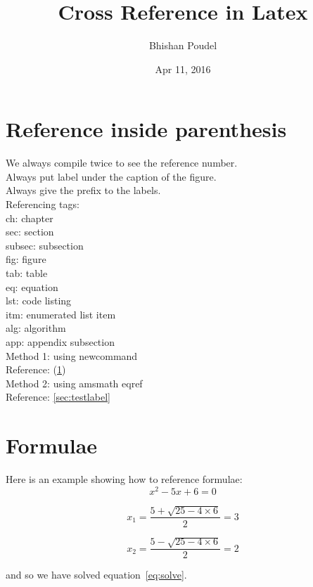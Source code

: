 \documentclass{article}
\title{Cross Reference in Latex}
\author{Bhishan Poudel}
\date{Apr 11, 2016}
\let\oldref\ref
\renewcommand{\ref}[1]{(\oldref{#1})}
\begin{document}
\maketitle
\tableofcontents
\listoffigures
\clearpage

\section{Reference inside parenthesis}\label{sec:testlabel}
We always compile twice to see the reference number.\\
Always put label under the caption of the figure.\\
Always give the prefix to the labels.\\
Referencing tags: \\
ch: 	chapter \\
sec: 	section\\
subsec: 	subsection\\
fig: 	figure\\
tab: 	table\\
eq: 	equation\\
lst: 	code listing\\
itm: 	enumerated list item\\
alg: 	algorithm\\
app: 	appendix subsection\\

Method 1: using newcommand\\
Reference: \ref{sec:testlabel} \\

Method 2: using amsmath eqref\\
Reference: \eqref{sec:testlabel} \\

\section{Formulae}
\label{sec:Formulae}

Here is an example showing how to reference formulae:\\

\begin{equation} \label{eq:solve}
x^2 - 5 x + 6 = 0
\end{equation}

\begin{equation}
x_1 = \frac{5 + \sqrt{25 - 4 \times 6}}{2} = 3
\end{equation}

\begin{equation}
x_2 = \frac{5 - \sqrt{25 - 4 \times 6}}{2} = 2
\end{equation}

and so we have solved equation~\autoref{eq:solve}.
\end{document}
